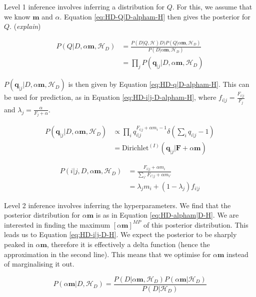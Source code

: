 Level 1 inference involves inferring a distribution for $Q$. For this, we assume that we know $\boldsymbol{m}$ and $\alpha$. Equation \ref{eq:HD-Q|D-alpham-H} then gives the posterior for $Q$. (\textit{explain}) 

\begin{align}
P(Q|D,\alpha\boldsymbol{m},\mathscr{H}_{D})&=\frac{P(D|Q,\mathscr{H}){D})P(Q|\alpha\boldsymbol{m},\mathscr{H}_{D})}{P(D|\alpha\boldsymbol{m},\mathscr{H}_{D})} \nonumber
\\
&=\prod_{j}P(\boldsymbol{q}_{|j}|D,\alpha\boldsymbol{m},\mathscr{H}_{D})
\label{eq:HD-Q|D-alpham-H}
\end{align}

\noindent $P(\boldsymbol{q}_{|j}|D,\alpha\boldsymbol{m},\mathscr{H}_{D})$ is then given by Equation \ref{eq:HD-q|D-alpham-H}. This can be used for prediction, as in Equation \ref{eq:HD-i|j-D-alpham-H}, where $f_{i|j}=\frac{F_{i|j}}{F_{j}}$ and $\lambda_{j}=\frac{\alpha}{F_{j}+\alpha}$.


\begin{align}
P(\boldsymbol{q}_{|j}|D,\alpha\boldsymbol{m},\mathscr{H}_{D})&\propto\prod_{i}q_{i|j}^{F_{i|j}+\alpha m_{i}-1}\delta(\sum_{i}q_{i|j}-1) \nonumber
\\
&=\text{Dirichlet}^{(I)}(\boldsymbol{q}_{|j}|\boldsymbol{F}+\alpha\boldsymbol{m})
\label{eq:HD-q|D-alpham-H}
\end{align}

\begin{align}
P(i|j,D,\alpha\boldsymbol{m},\mathscr{H}_{D})&=\frac{F_{i|j}+\alpha m_{i}}{\sum_{i'}F_{i'|j}+\alpha m_{i'}} \nonumber
\\
&=\lambda_{j}m_{i}+(1-\lambda_{j})f_{i|j}
\label{eq:HD-i|j-D-alpham-H}
\end{align}

Level 2 inference involves inferring the hyperparameters. We find that the posterior distribution for $\alpha\boldsymbol{m}$ is as in Equation \ref{eq:HD-alpham|D-H}. We are interested in finding the maximum $[\alpha\boldsymbol{m}]^{MP}$ of this posterior distribution. This leads us to Equation \ref{eq:HD-i|j-D-H}. We expect the posterior to be sharply peaked in $\alpha\boldsymbol{m}$, therefore it is effectively a delta function (hence the approximation in the second line). This means that we optimise for $\alpha\boldsymbol{m}$ instead of marginalising it out. 

\begin{equation}
P(\alpha\boldsymbol{m}|D,\mathscr{H}_{D})=\frac{P(D|\alpha\boldsymbol{m},\mathscr{H}_{D})P(\alpha\boldsymbol{m}|\mathscr{H}_{D})}{P(D|\mathscr{H}_{D})}
\label{eq:HD-alpham|D-H}
\end{equation}

